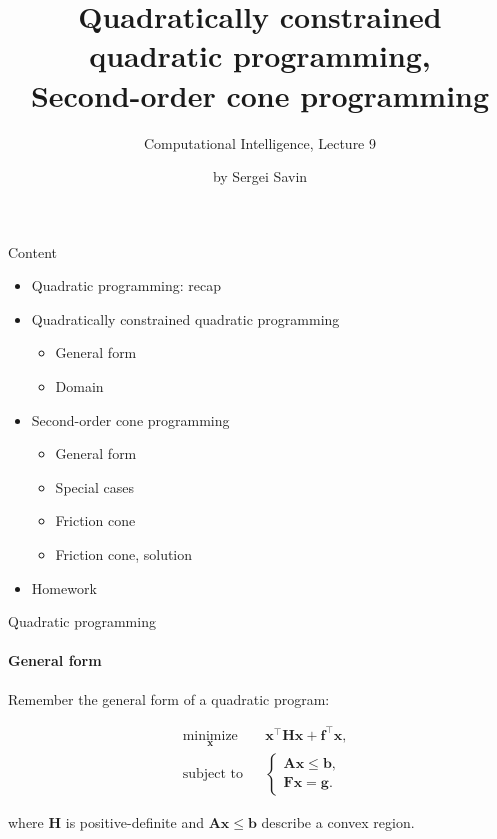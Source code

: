 \documentclass{beamer}
\title{Quadratically constrained quadratic programming, \\ Second-order cone programming}
\subtitle{Computational Intelligence, Lecture 9}
\author{by Sergei Savin}
\date{\mydate}
\begin{document}
\maketitle


\begin{frame}{Content}

\begin{itemize}
\item  Quadratic programming: recap
\item  Quadratically constrained quadratic programming
\begin{itemize}
    \item General form
    \item Domain
\end{itemize}
\item  Second-order cone programming
\begin{itemize}
    \item General form
    \item Special cases
    \item Friction cone
    \item Friction cone, solution
\end{itemize}
\item Homework
\end{itemize}

\end{frame}



\begin{frame}{Quadratic programming}
\framesubtitle{General form}
\begin{flushleft}

Remember the general form of a quadratic program:

%
\begin{equation}
\begin{aligned}
& \underset{\mathbf{x}}{\text{minimize}}
& & \mathbf{x}^\top \mathbf{H} \mathbf{x} + \mathbf{f}^\top\mathbf{x}, \\
& \text{subject to}
& & \begin{cases}
    \mathbf{A}\mathbf{x} \leq \mathbf{b}, \\
    \mathbf{F}\mathbf{x} = \mathbf{g}.
    \end{cases}
\end{aligned}
\end{equation}

where $\mathbf{H}$ is positive-definite and $\mathbf{A}\mathbf{x} \leq \mathbf{b}$ describe a convex region.
 
\end{flushleft}
\end{frame}
\end{document}
